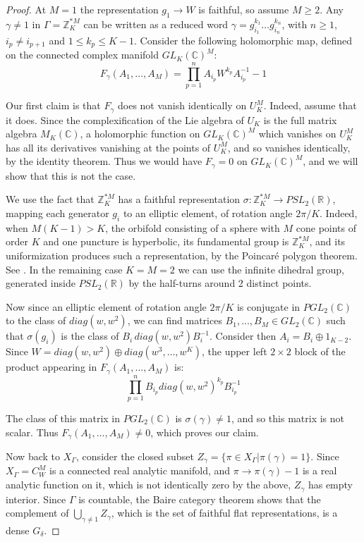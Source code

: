 \documentclass[12pt]{amsart}
\theoremstyle{definition}
\begin{document}
\begin{proof}
At $M=1$ the representation $g_1\to W$ is faithful, so assume $M\geq2$. Any $\gamma\neq1$ in $\Gamma=\mathbb Z_K^{*M}$ can be written as a reduced word $\gamma=g_{i_1}^{k_1}\ldots g_{i_n}^{k_n}$, with $n\geq1$, $i_p\neq i_{p+1}$ and $1\leq k_p\leq K-1$. Consider the following holomorphic map, defined on the connected complex manifold $GL_K(\mathbb C)^M$:
$$F_\gamma(A_1,\ldots,A_M)=\prod_{p=1}^nA_{i_p}W^{k_p}A_{i_p}^{-1}-1$$

Our first claim is that $F_\gamma$ does not vanish identically on $U_K^M$. Indeed, assume that it does. Since the complexification of the Lie algebra of $U_K$ is the full matrix algebra $M_K(\mathbb C)$, a holomorphic function on $GL_K(\mathbb C)^M$ which vanishes on $U_K^M$ has all its derivatives vanishing at the points of $U_K^M$, and so vanishes identically, by the identity theorem. Thus we would have $F_\gamma=0$ on $GL_K(\mathbb C)^M$, and we will show that this is not the case.

We use the fact that $\mathbb Z_K^{*M}$ has a faithful representation $\sigma:\mathbb Z_K^{*M}\to PSL_2(\mathbb R)$, mapping each generator $g_i$ to an elliptic element, of rotation angle $2\pi/K$. Indeed, when $M(K-1)>K$, the orbifold consisting of a sphere with $M$ cone points of order $K$ and one puncture is hyperbolic, its fundamental group is $\mathbb Z_K^{*M}$, and its uniformization produces such a representation, by the Poincar\'e polygon theorem. See \cite{bea,kat}. In the remaining case $K=M=2$ we can use the infinite dihedral group, generated inside $PSL_2(\mathbb R)$ by the half-turns around 2 distinct points.

Now since an elliptic element of rotation angle $2\pi/K$ is conjugate in $PGL_2(\mathbb C)$ to the class of $diag(w,w^2)$, we can find matrices $B_1,\ldots,B_M\in GL_2(\mathbb C)$ such that $\sigma(g_i)$ is the class of $B_i\,diag(w,w^2)B_i^{-1}$. Consider then $A_i=B_i\oplus1_{K-2}$. Since $W=diag(w,w^2)\oplus diag(w^3,\ldots,w^K)$, the upper left $2\times2$ block of the product appearing in $F_\gamma(A_1,\ldots,A_M)$ is:
$$\prod_{p=1}^nB_{i_p}diag(w,w^2)^{k_p}B_{i_p}^{-1}$$

The class of this matrix in $PGL_2(\mathbb C)$ is $\sigma(\gamma)\neq1$, and so this matrix is not scalar. Thus $F_\gamma(A_1,\ldots,A_M)\neq0$, which proves our claim.

Now back to $X_\Gamma$, consider the closed subset $Z_\gamma=\{\pi\in X_\Gamma|\pi(\gamma)=1\}$. Since $X_\Gamma=C_W^M$ is a connected real analytic manifold, and $\pi\to\pi(\gamma)-1$ is a real analytic function on it, which is not identically zero by the above, $Z_\gamma$ has empty interior. Since $\Gamma$ is countable, the Baire category theorem shows that the complement of $\bigcup_{\gamma\neq1}Z_\gamma$, which is the set of faithful flat representations, is a dense $G_\delta$.
\end{proof}
\end{document}
